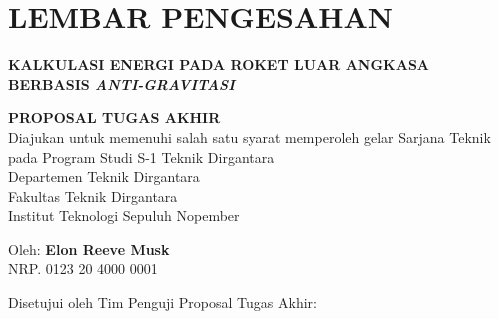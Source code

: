 \chapter*{LEMBAR PENGESAHAN}

\thispagestyle{empty}

\begin{center}
  \textbf{KALKULASI ENERGI PADA ROKET LUAR ANGKASA BERBASIS \emph{ANTI-GRAVITASI}}
\end{center}

\begingroup
  \small

  \begin{center}
    \textbf{PROPOSAL TUGAS AKHIR} \\
    Diajukan untuk memenuhi salah satu syarat memperoleh gelar
    Sarjana Teknik pada 
    Program Studi S-1 Teknik Dirgantara \\
    Departemen Teknik Dirgantara \\
    Fakultas Teknik Dirgantara \\
    Institut Teknologi Sepuluh Nopember
  \end{center}

  \begin{center}
    Oleh: \textbf{Elon Reeve Musk} \\
    NRP. 0123 20 4000 0001
  \end{center}

  \begin{center}
    Disetujui oleh Tim Penguji Proposal Tugas Akhir:
  \end{center}

  \begingroup
    \setlength{\tabcolsep}{0pt}

